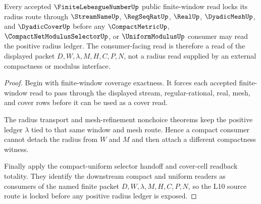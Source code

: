 \begin{theorem}
\label{thm:finite-lebesgue-number-l10-source-lock}
Every accepted $\FiniteLebesgueNumberUp$ public finite-window read locks its radius route through $\StreamNameUp$, $\RegSeqRatUp$, $\RealUp$, $\DyadicMeshUp$, and $\DyadicCoverUp$ before any $\CompactMetricUp$, $\CompactNetModulusSelectorUp$, or $\UniformModulusUp$ consumer may read the positive radius ledger. The consumer-facing read is therefore a read of the displayed packet $D,W,\lambda,M,H,C,P,N$, not a radius read supplied by an external compactness or modulus interface.
\end{theorem}
\begin{proof}
Begin with finite-window coverage exactness. It forces each accepted finite-window read to pass through the displayed stream, regular-rational, real, mesh, and cover rows before it can be used as a cover read.

The radius transport and mesh-refinement nonchoice theorems keep the positive ledger $\lambda$ tied to that same window and mesh route. Hence a compact consumer cannot detach the radius from $W$ and $M$ and then attach a different compactness witness.

Finally apply the compact-uniform selector handoff and cover-cell readback totality. They identify the downstream compact and uniform readers as consumers of the named finite packet $D,W,\lambda,M,H,C,P,N$, so the L10 source route is locked before any positive radius ledger is exposed.
\end{proof}

